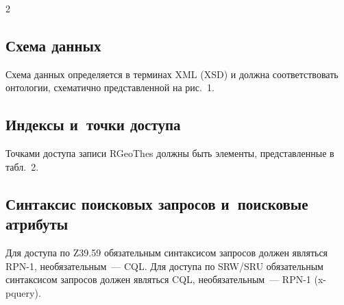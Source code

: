 \begin{multicols}{2}
  \subsection{Схема данных}
  
  Схема данных определяется в терминах {XML} (XSD) и должна соответствовать 
онтологии, схематично представленной на рис.~1.
  
  \subsection{Индексы и~точки доступа}
  
  Точками доступа записи \mbox{RGeoThes} должны быть элементы, представленные в 
табл.~2.
  
  \subsection{Синтаксис поисковых запросов и~поисковые атрибуты}
  
  Для доступа по Z39.59 обязательным синтаксисом запросов должен являться 
RPN-1, необязательным~--- {CQL}. Для доступа по \mbox{SRW/SRU} обязательным 
синтаксисом запросов должен являться {CQL}, необязательным~--- RPN-1 
  ({x-pquery}).
   
   \begin{table}\small
   \begin{center}
   \vspace*{2ex}
   

\end{center}
\end{table}
\end{multicols}
